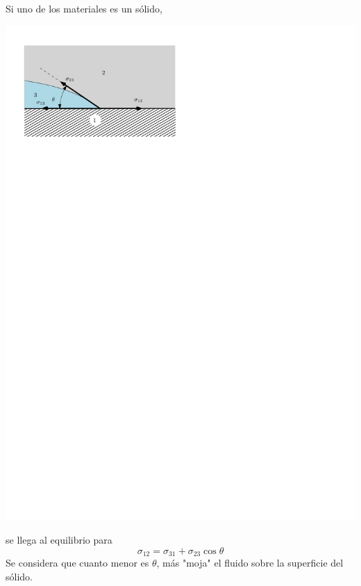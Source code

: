 Si uno de los materiales es un s\'olido,
\begin{center}
\includegraphics{TeX_files/chapter01-Introduccion/dosysolido}
\end{center}
se llega al equilibrio para
$$ \sigma_{12} = \sigma_{31} + \sigma_{23} \cos{\theta}$$
Se considera que cuanto menor es $\theta$, m\'as "moja" el fluido sobre la superficie del s\'olido.

